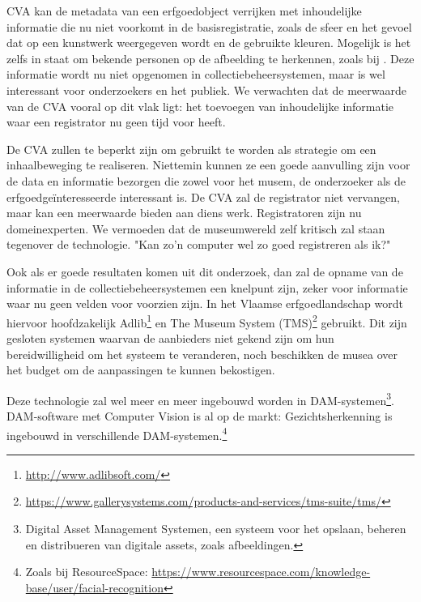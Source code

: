 \documentclass[fleqn,10pt]{voorstel}
\begin{document}
CVA kan de metadata van een erfgoedobject verrijken met inhoudelijke informatie die nu niet voorkomt in de basisregistratie, zoals de sfeer en het gevoel dat op een kunstwerk weergegeven wordt en de gebruikte kleuren. Mogelijk is het zelfs in staat om bekende personen op de afbeelding te herkennen, zoals bij \textcite{Hindle2017}. Deze informatie wordt nu niet opgenomen in collectiebeheersystemen, maar is wel interessant voor onderzoekers en het publiek. We verwachten dat de meerwaarde van de CVA vooral op dit vlak ligt: het toevoegen van inhoudelijke informatie waar een registrator nu geen tijd voor heeft. 

De CVA zullen te beperkt zijn om gebruikt te worden als strategie om een inhaalbeweging te realiseren. Niettemin kunnen ze een goede aanvulling zijn voor de data en informatie bezorgen die zowel voor het musem, de onderzoeker als de erfgoedge\"interesseerde interessant is. De CVA zal de registrator niet vervangen, maar kan een meerwaarde bieden aan diens werk. Registratoren zijn nu domeinexperten. We vermoeden dat de museumwereld zelf kritisch zal staan tegenover de technologie. "Kan zo'n computer wel zo goed registreren als ik?"

Ook als er goede resultaten komen uit dit onderzoek, dan zal de opname van de informatie in de collectiebeheersystemen een knelpunt zijn, zeker voor informatie waar nu geen velden voor voorzien zijn. In het Vlaamse erfgoedlandschap wordt hiervoor hoofdzakelijk Adlib\footnote{\url{http://www.adlibsoft.com/}} en The Museum System (TMS)\footnote{\url{https://www.gallerysystems.com/products-and-services/tms-suite/tms/}} gebruikt. Dit zijn gesloten systemen waarvan de aanbieders niet gekend zijn om hun bereidwilligheid om het systeem te veranderen, noch beschikken de musea over het budget om de aanpassingen te kunnen bekostigen.

Deze technologie zal wel meer en meer ingebouwd worden in DAM-systemen\footnote{Digital Asset Management Systemen, een systeem voor het opslaan, beheren en distribueren van digitale assets, zoals afbeeldingen.}. DAM-software met Computer Vision is al op de markt: Gezichtsherkenning is ingebouwd in verschillende DAM-systemen.\footnote{Zoals bij ResourceSpace: \url{https://www.resourcespace.com/knowledge-base/user/facial-recognition}}






\printbibliography[heading=bibintoc]
\end{document}
